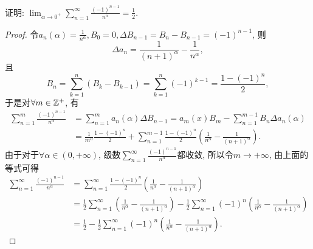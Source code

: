 \begin{quizb}
\begin{solution}
\end{solution}
\woe 证明: \(\lim_{\alpha\rightarrow 0^+}\sum_{n=1}^{\infty}\frac{(-1)^{n-1}}{n^\alpha}=\frac{1}{2}\).
\begin{proof}
令\(a_n(\alpha)=\frac{1}{n^\alpha},B_0=0,\Delta B_{n-1}=B_n-B_{n-1}=(-1)^{n-1}\), 则\[\Delta a_n=\frac{1}{(n+1)^\alpha}-\frac{1}{n^\alpha},\]且\[B_n=\sum_{k=1}^{n}\left(B_k-B_{k-1}\right)=\sum_{k=1}^{n}(-1)^{k-1}=\frac{1-(-1)^{n}}{2},\]于是对\(\forall m\in\mathbb{Z}^+\), 有\[\begin{split}
\sum_{n=1}^{m}\frac{(-1)^{n-1}}{n^\alpha}&=\sum_{n=1}^{m}a_n(\alpha)\Delta B_{n-1}=a_m(x)B_m-\sum_{n=1}^{m-1}B_n\Delta a_n(\alpha)\\
&=\frac{1}{m^\alpha}\frac{1-(-1)^n}{2}+\sum_{n=1}^{m-1}\frac{1-(-1)^n}{2}\left(\frac{1}{n^\alpha}-\frac{1}{(n+1)^\alpha}\right).
\end{split}\]
由于对于\(\forall\alpha\in(0,+\infty)\), 级数\(\sum_{n=1}^{\infty}\frac{(-1)^{n-1}}{n^\alpha}\)都收敛, 所以令\(m\rightarrow+\infty\), 由上面的等式可得\[\begin{split}
\sum_{n=1}^{\infty}\frac{(-1)^{n-1}}{n^\alpha}&=\sum_{n=1}^{\infty}\frac{1-(-1)^n}{2}\left(\frac{1}{n^\alpha}-\frac{1}{(n+1)^\alpha}\right)\\&=\frac{1}{2}\sum_{n=1}^{\infty}\left(\frac{1}{n^\alpha}-\frac{1}{(n+1)^\alpha}\right)-\frac{1}{2}\sum_{n=1}^{\infty}(-1)^n\left(\frac{1}{n^\alpha}-\frac{1}{(n+1)^\alpha}\right)\\&=\frac{1}{2}-\frac{1}{2}\sum_{n=1}^{\infty}(-1)^n\left(\frac{1}{n^\alpha}-\frac{1}{(n+1)^\alpha}\right).
\end{split}\]


\end{proof}
\end{quizb}
